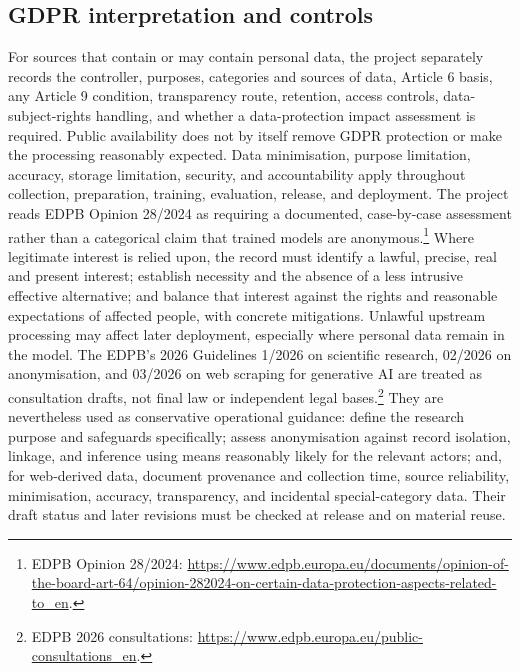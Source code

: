 \documentclass[9pt,a4paper]{article}
\begin{document}
\subsection{GDPR interpretation and controls}
For sources that contain or may contain personal data, the project separately records the controller, purposes, categories and sources of data, Article 6 basis, any Article 9 condition, transparency route, retention, access controls, data-subject-rights handling, and whether a data-protection impact assessment is required. Public availability does not by itself remove GDPR protection or make the processing reasonably expected. Data minimisation, purpose limitation, accuracy, storage limitation, security, and accountability apply throughout collection, preparation, training, evaluation, release, and deployment.
The project reads EDPB Opinion 28/2024 as requiring a documented, case-by-case assessment rather than a categorical claim that trained models are anonymous.\footnote{EDPB Opinion 28/2024: \url{https://www.edpb.europa.eu/documents/opinion-of-the-board-art-64/opinion-282024-on-certain-data-protection-aspects-related-to_en}.} Where legitimate interest is relied upon, the record must identify a lawful, precise, real and present interest; establish necessity and the absence of a less intrusive effective alternative; and balance that interest against the rights and reasonable expectations of affected people, with concrete mitigations. Unlawful upstream processing may affect later deployment, especially where personal data remain in the model.
The EDPB's 2026 Guidelines 1/2026 on scientific research, 02/2026 on anonymisation, and 03/2026 on web scraping for generative AI are treated as consultation drafts, not final law or independent legal bases.\footnote{EDPB 2026 consultations: \url{https://www.edpb.europa.eu/public-consultations_en}.} They are nevertheless used as conservative operational guidance: define the research purpose and safeguards specifically; assess anonymisation against record isolation, linkage, and inference using means reasonably likely for the relevant actors; and, for web-derived data, document provenance and collection time, source reliability, minimisation, accuracy, transparency, and incidental special-category data. Their draft status and later revisions must be checked at release and on material reuse.
\end{document}
